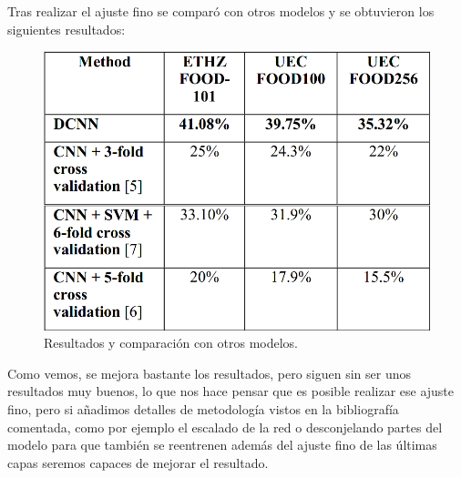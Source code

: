 Tras realizar el ajuste fino se comparó con otros modelos y se obtuvieron los siguientes resultados:

\begin{figure}[H]
  \centering
  \includegraphics[width=0.5\linewidth]{Imagenes/resultados_resnet_food.png}
  \caption{Resultados y comparación con otros modelos.}
  \label{fig:sub-first}
\end{figure}

Como vemos, se mejora bastante los resultados, pero siguen sin ser unos resultados muy buenos, lo que nos hace pensar que es posible realizar ese ajuste fino, pero si añadimos detalles de metodología vistos en la bibliografía comentada, como por ejemplo el escalado de la red o desconjelando partes del modelo para que también se reentrenen además del ajuste fino de las últimas capas seremos capaces de mejorar el resultado.
